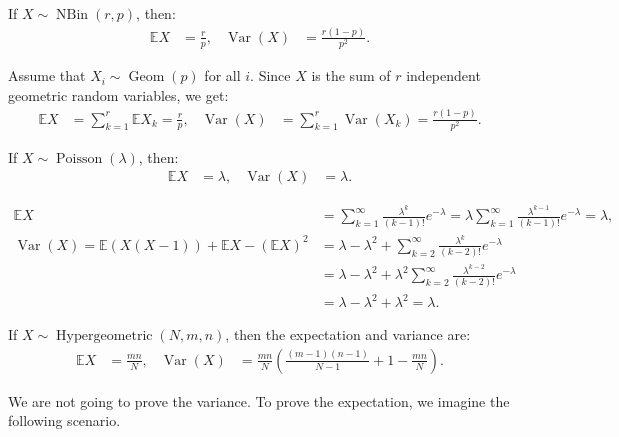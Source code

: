 \documentclass{huhtakm-template-book-v2}
\newcommand{\expect}{\mathbb{E}}
\DeclareMathOperator{\NBin}{NBin}
\DeclareMathOperator{\Geom}{Geom}
\DeclareMathOperator{\Poisson}{Poisson}
\DeclareMathOperator{\Hypergeometric}{Hypergeometric}
\DeclareMathOperator{\Var}{Var}
\begin{document}
    \begin{thm}
        If $X \sim \NBin(r,p)$, then:
        \begin{align*}
            \expect{X} &= \frac{r}{p}, & \Var(X) &= \frac{r(1-p)}{p^{2}}.
        \end{align*}
    \end{thm}
    \begin{proofing}
        Assume that $X_{i} \sim \Geom(p)$ for all $i$. Since $X$ is the sum of $r$ independent geometric random variables, we get:
        \begin{align*}
            \expect{X} &= \sum_{k = 1}^{r}\expect{X_{k}} = \frac{r}{p}, & \Var(X) &= \sum_{k = 1}^{r}\Var(X_{k}) = \frac{r(1-p)}{p^{2}}.
        \end{align*}
    \end{proofing}
    \begin{thm}
        If $X \sim \Poisson(\lambda)$, then:
        \begin{align*}
            \expect{X} &= \lambda, & \Var(X) &= \lambda.
        \end{align*}
    \end{thm}
    \begin{proofing}
        \begin{align*}
            \expect{X} &= \sum_{k = 1}^{\infty}\frac{\lambda^{k}}{(k-1)!}e^{-\lambda} = \lambda\sum_{k = 1}^{\infty}\frac{\lambda^{k-1}}{(k-1)!}e^{-\lambda} = \lambda,\\
            \Var(X) = \expect(X(X-1)) + \expect{X} - (\expect{X})^{2} &= \lambda - \lambda^{2} + \sum_{k = 2}^{\infty}\frac{\lambda^{k}}{(k-2)!}e^{-\lambda}\\
            &= \lambda - \lambda^{2} + \lambda^{2}\sum_{k = 2}^{\infty}\frac{\lambda^{k-2}}{(k-2)!}e^{-\lambda}\\
            &= \lambda - \lambda^{2} + \lambda^{2} = \lambda.
        \end{align*}
    \end{proofing}
    \begin{thm}
        If $X \sim \Hypergeometric(N,m,n)$, then the expectation and variance are:
        \begin{align*}
            \expect{X} &= \frac{mn}{N}, & \Var(X) &= \frac{mn}{N}\left(\frac{(m-1)(n-1)}{N-1} + 1 - \frac{mn}{N}\right).
        \end{align*}
    \end{thm}
    We are not going to prove the variance. To prove the expectation, we imagine the following scenario.
\end{document}
